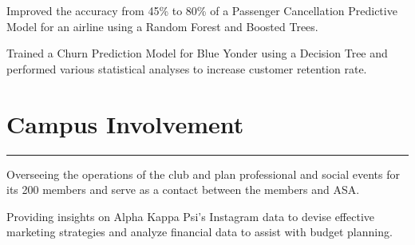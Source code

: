 \documentclass[]{sahana}
\begin{document}
\begin{minipage}[t]{0.66\textwidth}
\vspace{-4pt}
\noindent
\begin{tightemize}
\vspace{-6pt}
\item Improved the accuracy from 45\% to 80\% of a Passenger Cancellation Predictive Model for an airline using a Random Forest and Boosted Trees.
\item Trained a Churn Prediction Model for Blue Yonder using a Decision Tree and performed various statistical analyses to increase customer retention rate.
\end{tightemize}
\sectionsep

\section{Campus Involvement}
\noindent\rule{12.5cm}{0.4pt}

\vspace{-6pt}
\begin{tightemize}
\item Overseeing the operations of the club and plan professional and social events for its 200 members and serve as a contact between the members and ASA.
\end{tightemize}
\vspace{1pt}

\vspace{-5pt}
\begin{tightemize}
\item Providing insights on Alpha Kappa Psi's Instagram data to devise effective marketing strategies and analyze financial data to assist with budget planning.
\end{tightemize}
\vspace{1pt}


\end{minipage}
\end{document}
